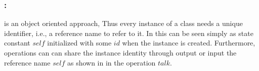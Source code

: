 \subsubsection{:} 
\label{instance_reference} 
\oz{} is an object oriented approach, Thus every instance of a class needs a unique identifier, i.e., a reference name to refer to it. In \oz{} this can be seen simply as state constant $self$ initialized with some $id$ when the instance is created. Furthermore, operations can can share the instance identity through output or input the reference name $self$ as shown in  in the operation $talk$.
